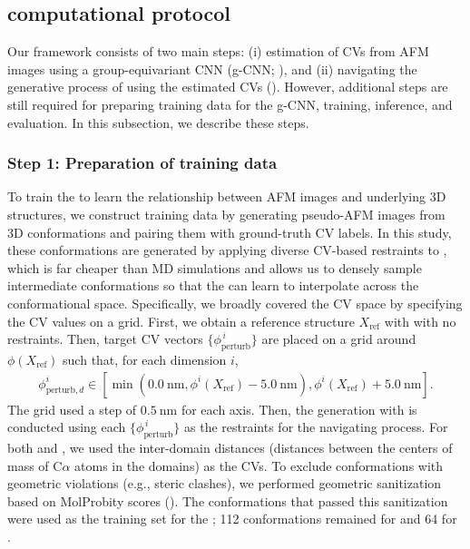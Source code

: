 \subsection{\Model computational protocol}
\label{subsec:protocol}

Our \Model framework consists of two main steps: (i) estimation of CVs from AFM images using a group-equivariant CNN (g-CNN; ), and (ii) navigating the generative process of \AFiii using the estimated CVs (). However, additional steps are still required for preparing training data for the g-CNN, training, inference, and evaluation. In this subsection, we describe these steps.

\subsubsection{Step 1: Preparation of training data}

To train the \gcnn to learn the relationship between AFM images and underlying 3D structures, we construct training data by generating pseudo-AFM images from 3D conformations and pairing them with ground-truth CV labels. 
In this study, these conformations are generated by applying diverse CV-based restraints to \AFiii, which is far cheaper than MD simulations and allows us to densely sample intermediate conformations so that the \gcnn can learn to interpolate across the conformational space.
Specifically, we broadly covered the CV space by specifying the CV values on a grid.
First, we obtain a reference structure $X_{\text{ref}}$ with \AFiii with no restraints.
Then, target CV vectors $\{\phi_{\text{perturb}}^{\,i}\}$ are placed on a grid around $\phi(X_{\text{ref}})$ such that, for each dimension $i$,
\begin{equation}
    \begin{split}
    \phi_{\text{perturb},d}^i \in \left[ \min(0.0~\mathrm{nm}, \phi^i(X_{\text{ref}}) - 5.0~\mathrm{nm}), \phi^i(X_{\text{ref}}) + 5.0~\mathrm{nm} \right].
    \label{eq:target_domain_distance}
    \end{split}
\end{equation}
The grid used a step of $0.5~\mathrm{nm}$ for each axis. Then, the generation with \AFiii is conducted using each $\{\phi_{\text{perturb}}^{\,i}\}$ as the restraints for the navigating process.
For both \AK and \flhac, we used the inter-domain distances (distances between the centers of mass of C$\alpha$ atoms in the domains) as the CVs.
To exclude conformations with geometric violations (e.g., steric clashes), we performed geometric sanitization based on MolProbity scores (). 
The conformations that passed this sanitization were used as the training set for the \gcnn; 112 conformations remained for \AK and 64 for \flhac.

